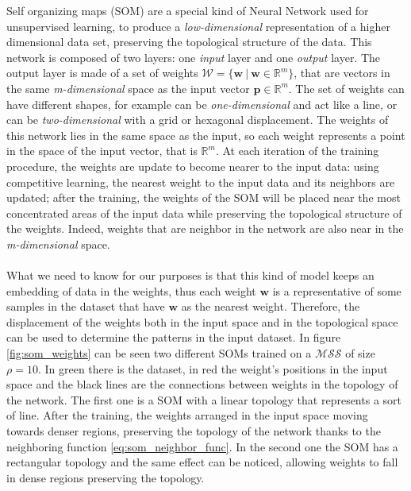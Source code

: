 Self organizing maps (SOM) are a special kind of Neural Network used for unsupervised learning, to produce a \textit{low-dimensional} representation of a higher dimensional data set, preserving the topological structure of the data. \newline
This network is composed of two layers: one \textit{input} layer and one \textit{output} layer. The output layer is made of a set of weights $\mathcal{W} = \{\textbf{w}\ |\ \textbf{w} \in \mathbb{R}^m\}$, that are vectors in the same \textit{m-dimensional} space as the input vector $\textbf{p} \in \mathbb{R}^m$.
The set of weights can have different shapes, for example can be \textit{one-dimensional} and act like a line, or can be \textit{two-dimensional} with a grid or hexagonal displacement. \newline
The weights of this network lies in the same space as the input, so each weight represents a point in the space of the input vector, that is $\mathbb{R}^m$. At each iteration of the training procedure, the weights are update to become nearer to the input data: using competitive learning, the nearest weight to the input data and its neighbors are updated; after the training, the weights of the SOM will be placed near the most concentrated areas of the input data while preserving the topological structure of the weights. Indeed, weights that are neighbor in the network are also near in the \textit{m-dimensional} space.

\paragraph{}
What we need to know for our purposes is that this kind of model keeps an embedding of data in the weights, thus each weight $\textbf{w}$ is a representative of some samples in the dataset that have $\textbf{w}$ as the nearest weight. Therefore, the displacement of the weights both in the input space and in the topological space can be used to determine the patterns in the input dataset. \newline
\hspace{5pt} In figure \ref{fig:som_weights} can be seen two different SOMs trained on a $\mathcal{MSS}$ of size $\rho = 10$. In green there is the dataset, in red the weight's positions in the input space and the black lines are the connections between weights in the topology of the network. \newline
The first one is a SOM with a linear topology that represents a sort of line. After the training, the weights arranged in the input space moving towards denser regions, preserving the topology of the network thanks to the neighboring function \ref{eq:som_neighbor_func}. \newline
In the second one the SOM has a rectangular topology and the same effect can be noticed, allowing weights to fall in dense regions preserving the topology.

